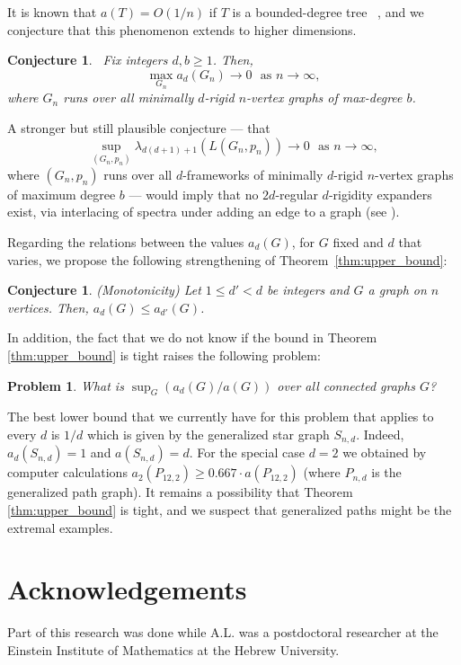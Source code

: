 \documentclass[a4paper,11pt]{article}
\theoremstyle{plain}
\newtheorem{problem}[theorem]{\bf Problem}
\newtheorem{conjecture}[theorem]{\bf Conjecture}
\theoremstyle{definition}
\begin{document}
It is known that $a(T) = O(1/n)$ if $T$ is a bounded-degree tree ~\cite{kolokolnikov2015maximizing}, and we conjecture that this phenomenon extends to higher dimensions.
\begin{conjecture}~\label{conj:percent-ev}
Fix integers $d,b\ge 1$. Then,
\[
\max_{G_n} a_d(G_n) \to 0~~~\mbox{as }n\to\infty,
\]
where $G_n$ runs over all minimally $d$-rigid $n$-vertex graphs of max-degree $b$.
\end{conjecture}

A  stronger but still plausible conjecture --- that $$\sup_{(G_n,p_n)}\lambda_{d(d+1)+1}(L(G_n,p_n))\to 0~~~\mbox{as }n\to\infty,$$ where 
$(G_n,p_n)$ runs over all $d$-frameworks of minimally $d$-rigid $n$-vertex graphs of maximum degree $b$ --- would imply that no $2d$-regular $d$-rigidity expanders exist, via interlacing of spectra under adding an edge to a graph (see \cite[Theorem 2.3]{lew2022d}).

Regarding the relations between the values $a_d(G)$, for $G$ fixed and $d$ that varies, we propose the following strengthening of Theorem~\ref{thm:upper_bound}:

\begin{conjecture}(Monotonicity)
Let $1\le d'<d$ be integers and $G$ a graph on $n$ vertices. Then,
$a_d(G) \le a_{d'}(G)$.
\end{conjecture}


In addition, the fact that we do not know if the bound in Theorem \ref{thm:upper_bound} is tight raises the following problem:
\begin{problem}
    What is $\sup_G (a_d(G) / a(G))$ over all connected graphs $G$?
\end{problem}
The best lower bound that we currently have for this problem that applies to every $d$ is $1/d$ which is given by the generalized star graph $S_{n,d}$. Indeed,  $a_d(S_{n,d})=1$ and $a(S_{n,d})=d$.
For the special case $d=2$ we obtained by computer calculations $a_2(P_{12,2})\geq 0.667\cdot a(P_{12,2})$ (where $P_{n,d}$ is the generalized path graph). It remains a possibility that Theorem \ref{thm:upper_bound} is tight, and we suspect that generalized paths might be the extremal examples. 






\section*{Acknowledgements}
Part of this research was done while A.L. was a postdoctoral researcher at the Einstein Institute of Mathematics at the Hebrew University.






\end{document}
